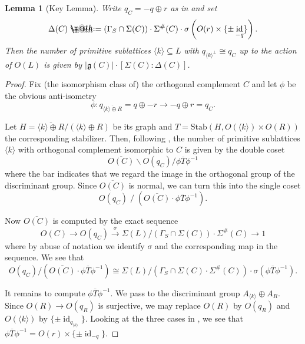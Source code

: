 \documentclass{amsart}
\makeatletter
\theoremstyle{definition}
\theoremstyle{plain}
\newtheorem{lemma}[definition]{Lemma}
\DeclareMathOperator{\id}{id}
\newcommand*{\defeq}{\mathrel{\rlap{%
                     \raisebox{0.3ex}{$\m@th\cdot$}}%
                     \raisebox{-0.3ex}{$\m@th\cdot$}}%
                     =}
\makeatother
\begin{document}
\begin{lemma}[Key Lemma]
 Write $q_C = -q \oplus r$ as in  and set
 \[\Delta(C)\defeq\left(\Gamma_S \cap \Sigma(C)\right)\cdot \Sigma^\#(C)
 \cdot \sigma\left(O(r)\times \{\pm \id_{-q}\}\right). \]
 Then the number of primitive sublattices $\langle k \rangle \subseteq L$ with $q_{\langle k \rangle^\perp} \cong q_C$ up to the action of $O(L)$ is given by $|\mathfrak{g}(C)|\cdot [\Sigma(C):\Delta(C)]$.
 \end{lemma}
\begin{proof}
 Fix (the isomorphism class of) the orthogonal complement $C$ and let $\phi$ be the obvious anti-isometry
 \[\phi \colon q_{\overline{\langle{k}\rangle \oplus R}}= q \oplus -r  \longrightarrow -q \oplus r=q_C.\]
 
 Let $H= \overline{\langle k \rangle \oplus R}/(\langle k \rangle \oplus R)$ be its graph and $T = \mbox{Stab}(H,O(\langle k\rangle) \times O(R))$ the corresponding stabilizer.
 Then, following \cite[Prop.\ 1.15.1]{nikulin}, the number of primitive sublattices $\langle k \rangle$ with orthogonal
 complement isomorphic to $C$ is given by the double coset
 \[
  \overline{O(C)}\backslash O(q_C)/ \phi
  \overline{T} \phi^{-1}
 \]
 where the bar indicates that we regard the image in the orthogonal group of the discriminant group.
 Since $\overline{O(C)}$ is normal, we can turn this into the single coset
 \begin{equation}\label{eqn:spin_sequence}
O(q_C) \; /\; \left(\overline{O(C)} \cdot
 \phi \overline{T} \phi^{-1}
 \right).
 \end{equation}

Now $\overline{O(C)}$ is computed by the exact sequence \cite[VIII Thm.\ 5.1]{miranda_morrison:embeddings}
 \[O(C) \rightarrow O(q_C) \xrightarrow{\sigma}
\Sigma(L)/(\Gamma_S\cap \Sigma(C))\cdot
\Sigma^\#(C)\rightarrow 1\]
 where by abuse of notation we identify $\sigma$ and the corresponding map in the sequence.
 We see that
 \[ O(q_C)/ (\overline{O(C)} \cdot \phi
  \overline{T} \phi^{-1}) \cong
\Sigma(L)/(\Gamma_S\cap \Sigma(C)\cdot
\Sigma^\#(C))\cdot \sigma(\phi\overline{T}\phi^{-1}).\]

It remains to compute $\phi\overline{T}\phi^{-1}$.
We pass to the discriminant group $A_{\langle k \rangle} \oplus A_R$. Since $O(R)\rightarrow O(q_R)$ is surjective,
we may replace $O(R)$ by $O(q_R)$ and $O(\langle k \rangle)$ by $\{\pm \id_{q_{\langle k\rangle }}\}$. Looking at the three cases in , we see that $\phi \overline{T} \phi^{-1}= O(r) \times \{\pm \id_{-q}\}$.
\end{proof}
\end{document}
